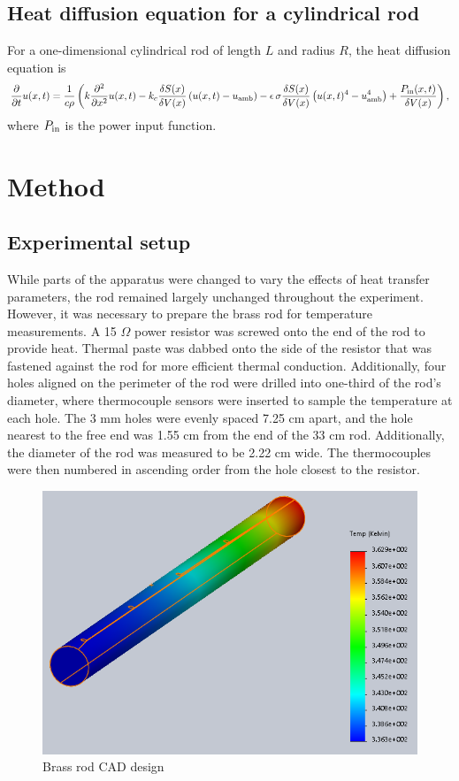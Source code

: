 \documentclass[letterpaper,titlepage,oneside]{report}
\begin{document}
\section{Heat diffusion equation for a cylindrical rod}
For a one-dimensional cylindrical rod of length $L$ and radius
$R$, the heat diffusion equation is 
\begin{equation}\label{eq:heatdiffrod}
  \frac{\partial}{\partial t}u(x,t) =
  \frac{1}{c\rho}\left(
  k\frac{\partial^2}{\partial x^2}u(x, t)
  -k_c\frac{\delta S(x)}{\delta V(x)}
  \left(u(x,t)-u_{\rm{amb}}\right) 
  -\epsilon\,\sigma\frac{\delta S(x)}{\delta V(x)}
  \left(u(x,t)^4-u_{\rm{amb}}^4\right)
  +\frac{P_{\rm{in}}(x,t)}{\delta V(x)}
  \right),
\end{equation}
where $P_{\rm{in}}$ is the power input function.

\chapter{Method}
\label{ch:method}

\section{Experimental setup}
While parts of the apparatus were changed to vary the effects of
heat transfer parameters, the rod remained largely unchanged
throughout the experiment. However, it was necessary to prepare
the brass rod for temperature measurements. A 15 $\Omega$ power
resistor was screwed onto the end of the rod to provide heat.
Thermal paste was dabbed onto the side of the resistor that was
fastened against the rod for more efficient thermal conduction.
Additionally, four holes aligned on the perimeter of the rod were
drilled into one-third of the rod's diameter, where thermocouple
sensors were inserted to sample the temperature at each hole.
The 3 mm holes were evenly spaced 7.25 cm apart, and the hole
nearest to the free end was 1.55 cm from the end of the 33 cm rod.
Additionally, the diameter of the rod was measured to be 2.22 cm
wide. The thermocouples were then numbered in ascending order from
the hole closest to the resistor.
\\

\begin{figure}[ht]
  \centering
  \includegraphics[width=.75\textwidth]{rod}
  \caption{Brass rod CAD design}
  \label{fig:rod}
\end{figure}
\end{document}

